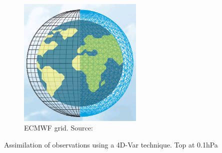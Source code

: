 \begin{figure}
	
	\includegraphics[width=14pc,angle=0]{ecmwf_grid.png}
	\caption{ECMWF grid. Source:\citep{ecmwf_infographic}}\label{fig:ecmwf_grid}
	\centering
\end{figure}


Assimilation of observations using a 4D-Var technique.
Top at 0.1hPa


